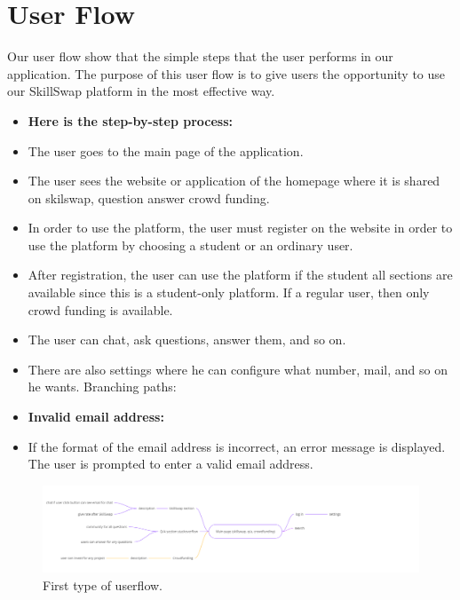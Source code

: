 \section{User Flow}\label{usrflow}
Our user flow show \cite{miro} that the simple steps that the user performs in our application.
The purpose of this user flow \cite{miro} is to give users the opportunity to use our SkillSwap \cite{skillswap} platform in the most effective way.
\begin{itemize}
    \item \textbf{Here is the step-by-step process:}

\item The user goes to the main page of the application.
\item The user sees the website or application of the homepage where it is shared on skilswap, question answer crowd funding.
\item In order to use the platform, the user must register on the website in order to use the platform by choosing a student or an ordinary user.
\item After registration, the user can use the platform if the student all sections are available since this is a student-only platform. If a regular user, then only crowd funding is available.
\item The user can chat, ask questions, answer them, and so on. 
\item There are also settings where he can configure what number, mail, and so on he wants. 
Branching paths:
\item \textbf{Invalid email address:}
\item If the format of the email address is incorrect, an error message is displayed.
The user is prompted to enter a valid email address.
\end{itemize}

\begin{figure}[ht]\label{fig:userflow1}
  \centering
  \includegraphics[width=1\linewidth]{figures/Userflow -2.png}
  \caption{First type of userflow.}
\end{figure}

